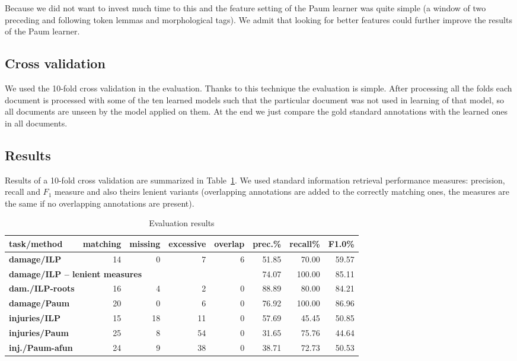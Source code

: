 Because we did not want to invest much time to this and the feature setting of the Paum learner was quite simple (a window of two preceding and following token lemmas and morphological tags). We admit that looking for better features could further improve the results of the Paum learner.

\subsection{Cross validation}
We used the 10-fold cross validation in the evaluation. Thanks to this technique the evaluation is simple. After processing all the folds each document is processed with some of the ten learned models such that the particular document was not used in learning of that model, so all documents are unseen by the model applied on them. At the end we just compare the gold standard annotations with the learned ones in all documents.

\subsection{Results}
Results of a 10-fold cross validation are summarized in Table~\ref{tab:EvaluationResults}. We used standard information retrieval performance measures: precision, recall and $F_1$ measure and also theirs lenient variants (overlapping annotations are added to the correctly matching ones, the measures are the same if no overlapping annotations are present).

\begin{table}[t]
	\centering
			
\begin{tabular}{|l||r|r|r|r|r|r|r|}
\hline
\textbf{task/method} & \textbf{matching} & \textbf{missing} & \textbf{excessive} & \textbf{overlap} & \textbf{prec.}\% & \textbf{recall}\% & \textbf{F1.0}\%\\
\hline
\hline
\textbf{damage/ILP} & 14 & 0 & 7 & 6 & 51.85 & 70.00 & 59.57\\
\hline
\multicolumn{5}{|l|}{\textbf{damage/ILP -- lenient measures}} & 74.07 & 100.00 & 85.11\\
\hline
\textbf{dam./ILP-roots} & 16 & 4 & 2 & 0 & 88.89 & 80.00 & 84.21\\
\hline
\textbf{damage/Paum} & 20 & 0 & 6 & 0 & 76.92 & 100.00 & 86.96\\
\hline
\hline
\textbf{injuries/ILP} & 15 & 18 & 11 & 0 & 57.69 & 45.45 & 50.85\\
\hline
\textbf{injuries/Paum} & 25 & 8 & 54 & 0 & 31.65 & 75.76 & 44.64\\
\hline
\textbf{inj./Paum-afun} & 24 & 9 & 38 & 0 & 38.71 & 72.73 & 50.53\\
\hline
\end{tabular}
						
	\caption{Evaluation results }
	\label{tab:EvaluationResults}
	\vspace{-0.80cm}
\end{table}

